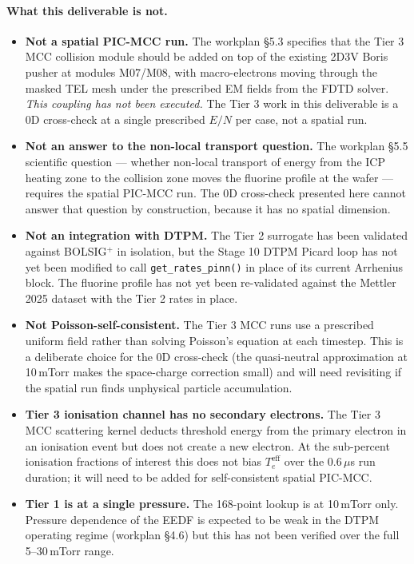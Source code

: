 \documentclass[11pt,a4paper]{article}
\begin{document}
\paragraph{What this deliverable is not.}
\begin{itemize}
  \item \textbf{Not a spatial PIC-MCC run.} The workplan §5.3
        specifies that the Tier 3 MCC collision module should be
        added on top of the existing 2D3V Boris pusher at
        modules M07/M08, with macro-electrons moving through
        the masked TEL mesh under the prescribed EM fields from
        the FDTD solver. \emph{This coupling has not been
        executed.} The Tier 3 work in this deliverable is a 0D
        cross-check at a single prescribed $E/N$ per case, not a
        spatial run.
  \item \textbf{Not an answer to the non-local transport
        question.} The workplan §5.5 scientific question ---
        whether non-local transport of energy from the ICP
        heating zone to the collision zone moves the fluorine
        profile at the wafer --- requires the spatial PIC-MCC
        run. The 0D cross-check presented here cannot answer
        that question by construction, because it has no spatial
        dimension.
  \item \textbf{Not an integration with DTPM.} The Tier 2
        surrogate has been validated against BOLSIG$^+$ in
        isolation, but the Stage 10 DTPM Picard loop has not yet
        been modified to call \texttt{get\_rates\_pinn()} in
        place of its current Arrhenius block. The fluorine
        profile has not yet been re-validated against the
        Mettler 2025 dataset with the Tier 2 rates in place.
  \item \textbf{Not Poisson-self-consistent.} The Tier 3 MCC
        runs use a prescribed uniform field rather than solving
        Poisson's equation at each timestep. This is a
        deliberate choice for the 0D cross-check (the
        quasi-neutral approximation at 10\,mTorr makes the
        space-charge correction small) and will need revisiting
        if the spatial run finds unphysical particle
        accumulation.
  \item \textbf{Tier 3 ionisation channel has no secondary
        electrons.} The Tier 3 MCC scattering kernel deducts
        threshold energy from the primary electron in an
        ionisation event but does not create a new electron. At
        the sub-percent ionisation fractions of interest this
        does not bias $T_e^{\mathrm{eff}}$ over the 0.6\,$\mu$s
        run duration; it will need to be added for
        self-consistent spatial PIC-MCC.
  \item \textbf{Tier 1 is at a single pressure.} The 168-point
        lookup is at 10\,mTorr only. Pressure dependence of the
        EEDF is expected to be weak in the DTPM operating regime
        (workplan §4.6) but this has not been verified over the
        full 5--30\,mTorr range.
\end{itemize}
\end{document}

